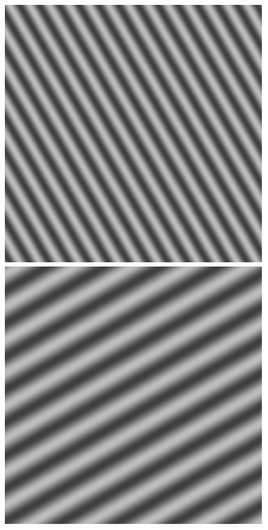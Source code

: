\section{\result}
\begin{figure}[h]
    \centering
    \begin{minipage}[b]{.19\textwidth}
        \centering
        \includegraphics[keepaspectratio,width=\textwidth]{../../Figures/07_10_l30.pdf}
    \end{minipage}
    \begin{minipage}[b]{.19\textwidth}
        \centering
        \includegraphics[keepaspectratio,width=\textwidth]{../../Figures/07_11_r60.pdf}

\end{minipage}
\end{figure}
